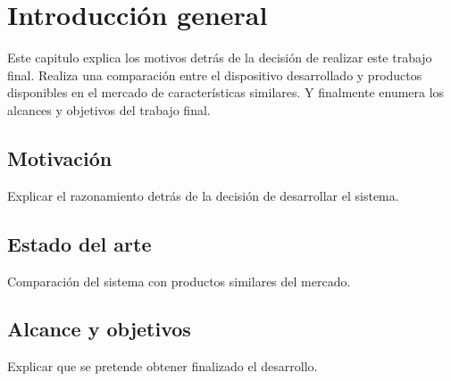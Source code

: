 
\chapter{Introducción general} %

Este capitulo explica los motivos detrás de la decisión de realizar este trabajo final. Realiza una comparación entre el dispositivo desarrollado y productos disponibles en el mercado de características similares. Y finalmente enumera los alcances y objetivos del trabajo final.

\label{Chapter1} %
\label{IntroGeneral}


\newcommand{\keyword}[1]{\textbf{#1}}
\newcommand{\tabhead}[1]{\textbf{#1}}
\newcommand{\code}[1]{\texttt{#1}}
\newcommand{\file}[1]{\texttt{\bfseries#1}}
\newcommand{\option}[1]{\texttt{\itshape#1}}
\newcommand{\grados}{$^{\circ}$}



\section{Motivación}

Explicar el razonamiento detrás de la decisión de desarrollar el sistema.

\section{Estado del arte}

Comparación del sistema con productos similares del mercado.

\section{Alcance y objetivos}

Explicar que se pretende obtener finalizado el desarrollo.


